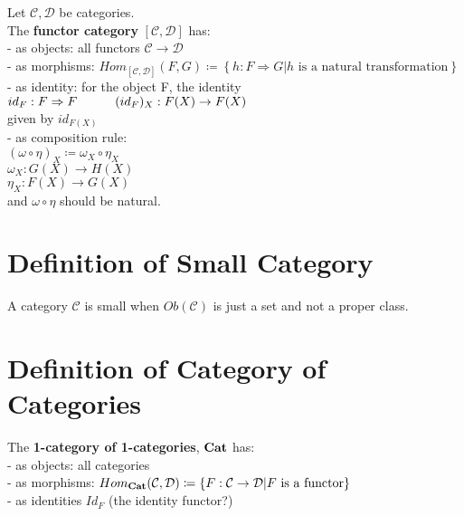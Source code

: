 \documentclass[a4paper, twoside, english, 11pt]{book}
\newcommand{\braces}[1] {\left \{ #1 \right \}}
\newcommand{\C}{\mathcal C}
\newcommand{\D}{\mathcal D}
\newcommand{\catname}[1]{{\normalfont\textbf{#1}}}
\newcommand{\Cat}{\catname{Cat}}
\begin{document}
Let $\C, \D$ be categories. \\
The \textbf{functor category} $[\C, \D]$ has: \\

- as objects: all functors $\C \rightarrow \D$ \\

- as morphisms: $Hom_{[\C, \D]}(F, G) \coloneqq \braces{h : F \Rightarrow G | h \text{ is a natural transformation}}$ \\

- as identity: for the object F, the identity $id_F : F \Rightarrow F \\
\indent\indent
(id_F)_X : F(X) \rightarrow F(X)$ \\
\indent\indent
given by $id_{F(X)}$ \\

- as composition rule: \\
\indent\indent
$(\omega \circ \eta)_X \coloneqq \omega_X \circ \eta_X$ \\

\indent\indent
$\omega_X : G(X) \rightarrow H(X)$ \\
\indent\indent
$\eta_X : F(X) \rightarrow G(X)$ \\

and $\omega \circ \eta$ should be natural.



\section{Definition of Small Category}

A category $\C$ is small when $Ob(\C)$ is just a set and not a proper class.



\section{Definition of Category of Categories}

The \textbf{1-category of 1-categories}, $\Cat$ has: \\

- as objects: all categories \\

- as morphisms: $Hom_\Cat(\C, \D) \coloneqq \braces{F : \C \rightarrow \D | F \text{ is a functor}}$ \\

- as identities $Id_F$ (the identity functor?) \\
\end{document}
